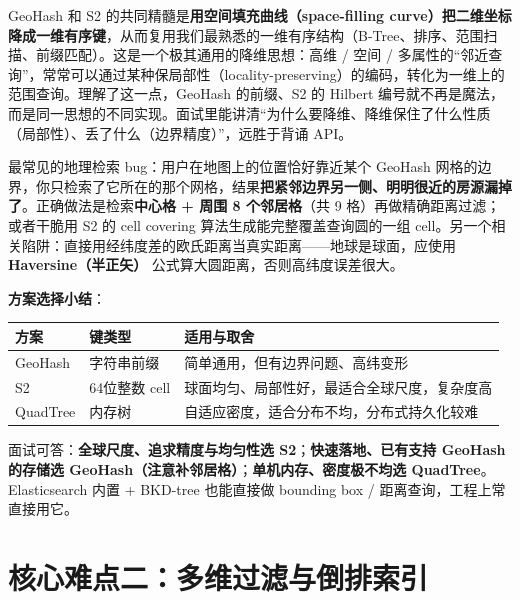 \begin{idea}
GeoHash 和 S2 的共同精髓是\textbf{用空间填充曲线（space-filling curve）把二维坐标降成一维有序键}，从而复用我们最熟悉的一维有序结构（B-Tree、排序、范围扫描、前缀匹配）。这是一个极其通用的降维思想：高维 / 空间 / 多属性的“邻近查询”，常常可以通过某种保局部性（locality-preserving）的编码，转化为一维上的范围查询。理解了这一点，GeoHash 的前缀、S2 的 Hilbert 编号就不再是魔法，而是同一思想的不同实现。面试里能讲清“为什么要降维、降维保住了什么性质（局部性）、丢了什么（边界精度）”，远胜于背诵 API。
\end{idea}

\begin{pitfall}
最常见的地理检索 bug：用户在地图上的位置恰好靠近某个 GeoHash 网格的边界，你只检索了它所在的那个网格，结果\textbf{把紧邻边界另一侧、明明很近的房源漏掉了}。正确做法是检索\textbf{中心格 + 周围 8 个邻居格}（共 9 格）再做精确距离过滤；或者干脆用 S2 的 cell covering 算法生成能完整覆盖查询圆的一组 cell。另一个相关陷阱：直接用经纬度差的欧氏距离当真实距离——地球是球面，应使用 \textbf{Haversine（半正矢）} 公式算大圆距离，否则高纬度误差很大。
\end{pitfall}

\textbf{方案选择小结}：

\begin{center}
\begin{tabularx}{\linewidth}{@{}l l X@{}}
\toprule
\textbf{方案} & \textbf{键类型} & \textbf{适用与取舍} \\
\midrule
GeoHash & 字符串前缀 & 简单通用，但有边界问题、高纬变形 \\
S2 & 64位整数 cell & 球面均匀、局部性好，最适合全球尺度，复杂度高 \\
QuadTree & 内存树 & 自适应密度，适合分布不均，分布式持久化较难 \\
\bottomrule
\end{tabularx}
\end{center}

面试可答：\textbf{全球尺度、追求精度与均匀性选 S2}；\textbf{快速落地、已有支持 GeoHash 的存储选 GeoHash（注意补邻居格）}；\textbf{单机内存、密度极不均选 QuadTree}。Elasticsearch 内置  + BKD-tree 也能直接做 bounding box / 距离查询，工程上常直接用它。

\section{核心难点二：多维过滤与倒排索引}

